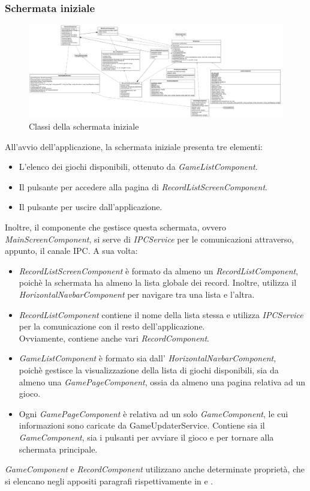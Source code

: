 \subsubsection{Schermata iniziale}
\begin{figure}[h]
    \centering
    \includegraphics[width=340pt]{images/prog/MainScreen.png}
    \caption{Classi della schermata iniziale}
    \label{fig:schermataIniziale}
\end{figure}
All'avvio dell'applicazione, la schermata iniziale presenta tre elementi:
\begin{itemize}
    \item L'elenco dei giochi disponibili, ottenuto da \emph{GameListComponent}.
    \item Il pulsante per accedere alla pagina di \emph{RecordListScreenComponent}.
    \item Il pulsante per uscire dall'applicazione.
\end{itemize}
Inoltre, il componente che gestisce questa schermata, ovvero \emph{MainScreenComponent}, si serve di \emph{IPCService} per le comunicazioni attraverso, appunto, il canale IPC.
A sua volta:
\begin{itemize}
    \item \emph{RecordListScreenComponent} è formato da almeno un \emph{RecordListComponent}, poichè la schermata ha almeno la lista globale dei record. Inoltre, utilizza il \emph{HorizontalNavbarComponent} per navigare tra una lista e l'altra.
    \item \emph{RecordListComponent} contiene il nome della lista stessa e utilizza \emph{IPCService} per la comunicazione con il resto dell'applicazione.\\ Ovviamente, contiene anche vari \emph{RecordComponent}.
    \item \emph{GameListComponent} è formato sia dall' \emph{HorizontalNavbarComponent},\\ poichè gestisce la visualizzazione della lista di giochi disponibili, sia da almeno una \emph{GamePageComponent}, ossia da almeno una pagina relativa ad un gioco.
    \item Ogni \emph{GamePageComponent} è relativa ad un solo \emph{GameComponent}, le cui informazioni sono caricate da GameUpdaterService. Contiene sia il \emph{GameComponent}, sia i pulsanti per avviare il gioco e per tornare alla schermata principale.
\end{itemize}
\emph{GameComponent} e \emph{RecordComponent} utilizzano anche determinate proprietà, che si elencano negli appositi paragrafi rispettivamente in  e .
